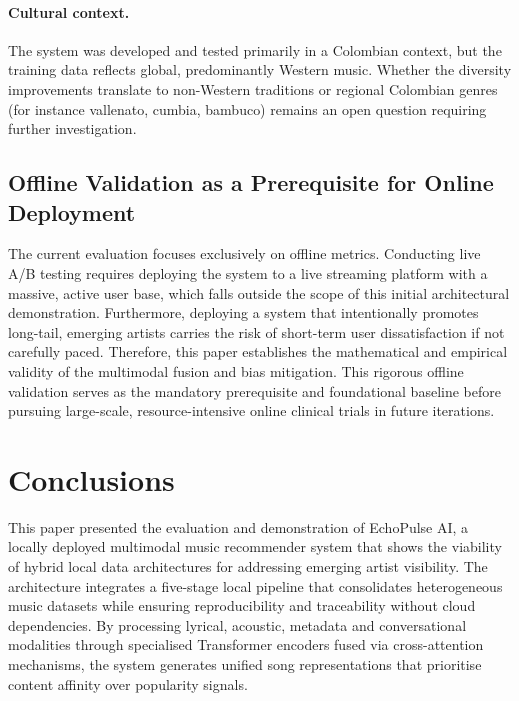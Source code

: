 \documentclass[]{ceurart}
\begin{document}
\paragraph{Cultural context.}
The system was developed and tested primarily in a Colombian context, but the
training data reflects global, predominantly Western music. Whether the
diversity improvements translate to non-Western traditions or regional Colombian
genres (for instance vallenato, cumbia, bambuco) remains an open question
requiring further investigation.

\subsection{Offline Validation as a Prerequisite for Online Deployment}
The current evaluation focuses exclusively on offline metrics. Conducting live
A/B testing requires deploying the system to a live streaming platform with a
massive, active user base, which falls outside the scope of this initial
architectural demonstration. Furthermore, deploying a system that intentionally
promotes long-tail, emerging artists carries the risk of short-term user
dissatisfaction if not carefully paced. Therefore, this paper establishes the
mathematical and empirical validity of the multimodal fusion and bias
mitigation. This rigorous offline validation serves as the mandatory
prerequisite and foundational baseline before pursuing large-scale,
resource-intensive online clinical trials in future iterations.

\section{Conclusions}
\label{sec:conclusion}

This paper presented the evaluation and demonstration of EchoPulse AI, a locally
deployed multimodal music recommender system that shows the viability of hybrid
local data architectures for addressing emerging artist visibility. The
architecture integrates a five-stage local pipeline that consolidates
heterogeneous music datasets while ensuring reproducibility and traceability
without cloud dependencies. By processing lyrical, acoustic, metadata and
conversational modalities through specialised Transformer encoders fused via
cross-attention mechanisms, the system generates unified song representations
that prioritise content affinity over popularity signals.
\end{document}
